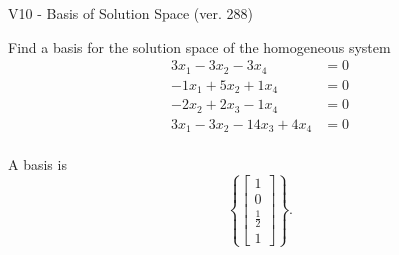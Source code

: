 \begin{exercise}
  \begin{exerciseTitle}V10 - Basis of Solution Space (ver. 288)\end{exerciseTitle}
  \begin{exerciseStatement}
    Find a basis for the solution space of the homogeneous system 
\begin{align*}
 3 x_ 1 -3 x_ 2 -3 x_ 4 &= 0  \\ 
  -1 x_ 1 + 5 x_ 2 + 1 x_ 4 &= 0  \\ 
  -2 x_ 2 + 2 x_ 3 -1 x_ 4 &= 0  \\ 
  3 x_ 1 -3 x_ 2 -14 x_ 3 + 4 x_ 4 &= 0  \\ 
 \end{align*}


 
  \end{exerciseStatement}

  \begin{exerciseAnswer}
   A basis is   
\[\left\{\left[\begin{array}{c}
1 \\
0 \\
\frac{1}{2} \\
1
\end{array}\right]\right\}.\]

  


  \end{exerciseAnswer}
\end{exercise}